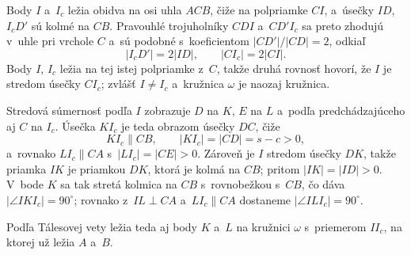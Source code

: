 {    Body $I$ a~$I_c$ ležia obidva na osi uhla $ACB$, čiže na polpriamke $CI$, a~úsečky $ID$, $I_cD'$ sú kolmé na $CB$. Pravouhlé trojuholníky $CDI$ a~$CD'I_c$ sa preto zhodujú v~uhle pri vrchole $C$ a~sú podobné s~koeficientom $|CD'| / |CD| = 2$, odkiaľ
    $$
    |I_cD'| = 2|ID|, \qquad |CI_c| = 2|CI|.
    $$
    Body $I$, $I_c$ ležia na tej istej polpriamke z~$C$, takže druhá rovnosť hovorí, že $I$ je stredom úsečky $CI_c$; zvlášť $I \neq I_c$ a~kružnica $\omega$ je naozaj kružnica.

    Stredová súmernosť podľa $I$ zobrazuje $D$ na $K$, $E$ na $L$ a~podľa predchádzajúceho aj $C$ na $I_c$. Úsečka $KI_c$ je teda obrazom úsečky $DC$, čiže
    $$
    KI_c \parallel CB, \qquad |KI_c| = |CD| = s - c > 0,
    $$
    a~rovnako $LI_c \parallel CA$ s~$|LI_c| = |CE| > 0$. Zároveň je $I$ stredom úsečky $DK$, takže priamka $IK$ je priamkou $DK$, ktorá je kolmá na $CB$; pritom $|IK| = |ID| > 0$. V~bode $K$ sa tak stretá kolmica na $CB$ s~rovnobežkou s~$CB$, čo dáva $|\angle IKI_c| = 90^\circ$; rovnako z~$IL \perp CA$ a~$LI_c \parallel CA$ dostaneme $|\angle ILI_c| = 90^\circ$.

    Podľa Tálesovej vety ležia teda aj body $K$ a~$L$ na kružnici $\omega$ s~priemerom $II_c$, na ktorej už ležia $A$ a~$B$.
}


